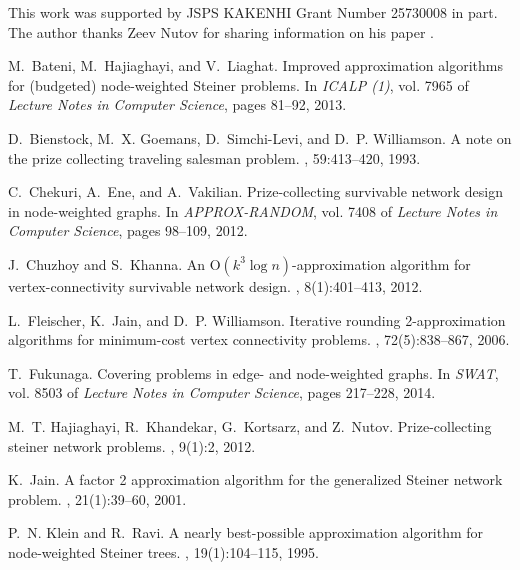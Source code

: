 \documentclass[11pt]{article}
\begin{document}
This work was supported by
JSPS KAKENHI Grant Number 25730008 in part.
The author thanks Zeev Nutov for sharing information on his paper \cite{Nutov12uncrossable}.



\begin{thebibliography}{10}

M.~Bateni, M.~Hajiaghayi, and V.~Liaghat.
\newblock Improved approximation algorithms for (budgeted) node-weighted
  {S}teiner problems.
\newblock In {\em ICALP (1)}, vol. 7965 of {\em Lecture Notes in Computer
  Science}, pages 81--92, 2013.

D.~Bienstock, M.~X. Goemans, D.~Simchi-Levi, and D.~P. Williamson.
\newblock A note on the prize collecting traveling salesman problem.
, 59:413--420, 1993.

C.~Chekuri, A.~Ene, and A.~Vakilian.
\newblock Prize-collecting survivable network design in node-weighted graphs.
\newblock In {\em APPROX-RANDOM}, vol. 7408 of {\em Lecture Notes in Computer
  Science}, pages 98--109, 2012.

J.~Chuzhoy and S.~Khanna.
\newblock An {O$(k^{3}\log n)$}-approximation algorithm for vertex-connectivity
  survivable network design.
, 8(1):401--413, 2012.

L.~Fleischer, K.~Jain, and D.~P. Williamson.
\newblock Iterative rounding 2-approximation algorithms for minimum-cost vertex
  connectivity problems.
, 72(5):838--867, 2006.

T.~Fukunaga.
\newblock Covering problems in edge- and node-weighted graphs.
\newblock In {\em SWAT}, vol. 8503 of {\em Lecture Notes in Computer Science},
  pages 217--228, 2014.

M.~T. Hajiaghayi, R.~Khandekar, G.~Kortsarz, and Z.~Nutov.
\newblock Prize-collecting steiner network problems.
, 9(1):2, 2012.

K.~Jain.
\newblock A factor 2 approximation algorithm for the generalized {S}teiner
  network problem.
, 21(1):39--60, 2001.

P.~N. Klein and R.~Ravi.
\newblock A nearly best-possible approximation algorithm for node-weighted
  {S}teiner trees.
, 19(1):104--115, 1995.


\end{thebibliography}
\end{document}
